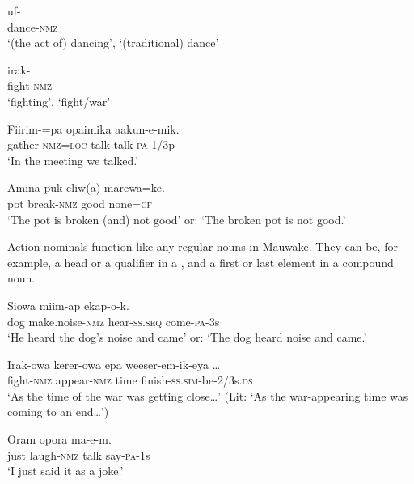 \ea%
\label{ex:3:x62}
\gll uf- \\
dance-\textsc{nmz}\\
\glt`(the act of) dancing', `(traditional) dance'
\z

\ea%
\label{ex:3:x63}
\gll irak- \\
fight-\textsc{nmz}\\
\glt`fighting', `fight/war' 
\z 

\ea%
\label{ex:3:x1231}
\gll Fiirim-=pa opaimika aakun-e-mik. \\
gather-\textsc{nmz}=\textsc{loc} talk talk-\textsc{pa}-1/3p\\
\glt`In the meeting we talked.'
\z

\ea%
\label{ex:3:x1247}
\gll Amina puk eliw(a) marewa=ke. \\
pot break-\textsc{nmz} good none=\textsc{cf}\\
\glt`The pot is broken (and) not good' or: `The broken pot is not good.'
\z

Action nominals function like any regular nouns in Mauwake. They can be, for example, a head  or a qualifier  in a , and a first  or last element  in a compound noun.

\ea%
\label{ex:3:x64}
\gll Siowa  miim-ap ekap-o-k. \\
dog make.noise-\textsc{nmz} hear-\textsc{ss}.\textsc{seq} come-\textsc{pa}-3s\\
\glt`He heard the dog's noise and came' or: `The dog heard noise and came.'
\z

\ea%
\label{ex:3:x65}
\gll Irak-owa kerer-owa epa weeser-em-ik-eya {\dots}{\footnotemark} \\
fight-\textsc{nmz} appear-\textsc{nmz} time finish-\textsc{ss}.\textsc{sim}-be-2/3s.\textsc{ds}\\
\glt`As the time of the war was getting close{\dots}' (Lit: `As the war-appearing time was coming to an end{\dots}')
\z 


\ea%
\label{ex:3:x66}
\gll Oram  opora ma-e-m. \\
just laugh-\textsc{nmz} talk say-\textsc{pa}-1s\\
\glt`I just said it as a joke.'
\z


